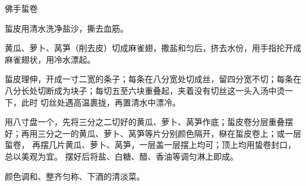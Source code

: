 %
%
%
%
%
%
%
\begin{recipe}{佛手蜇卷}

\ingredients


\preparation

\step 蜇皮用清水洗净盐沙，撕去血筋。

\step 黄瓜、萝卜、莴笋（削去皮）切成麻雀翅，撒盐和匀后，挤去水份，用手指抡开成
麻雀翅状，用冷水漂起。

\step 蜇皮理伸，开成一寸二宽的条子；每条在八分宽处切成丝，留四分宽不切；每条在
八分长处切断成为块子；每切五至六块重叠起，夹着没有切丝这一头入汤中烫一下，此时
切丝处遇高温裹拢，再置清水中漂冷。

\step 用八寸盘一个，先将三分之二切好的黄瓜、萝卜、莴笋作底；蜇皮卷分层重叠摆
好；再用三分之一的黄瓜、萝卜、莴笋等片分别颜色隔开，㮟在蜇皮卷上；或一层蜇卷，
再摆几片黄瓜、萝卜、莴笋，一层盖一层摆上均可；顶上均用蛰卷封口，总以美观为宜。
摆好后将盐、白糖、醋、香油等调匀淋上即成。

\features

颜色调和、整齐匀称、下酒的清淡菜。

\end{recipe}

